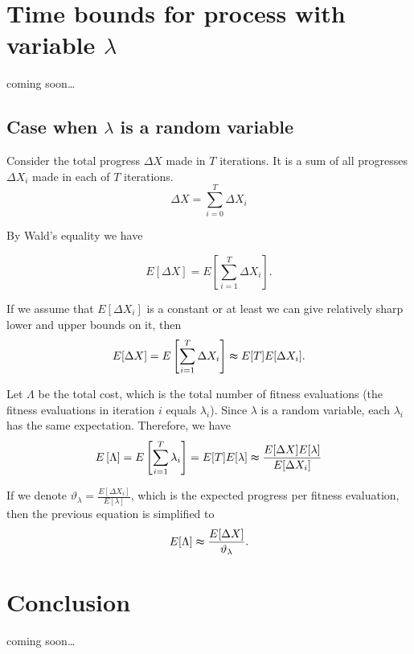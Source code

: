 \documentclass[12pt, a4paper]{article}
\theoremstyle{remark}
\newcommand{\cm}{coming soon\dots}
\begin{document}



\section{Time bounds for process with variable $\lambda$}
\cm
\subsection{Case when $\lambda$ is a random variable}
Consider the total progress $\Delta X$ made in $T$ iterations. It is a sum of all progresses $\Delta X_i$ made in each of $T$ iterations.
\[
    \Delta X = \sum_{i = 0}^{T} \Delta X_i
\]

By Wald's equality we have

\[
    E[\Delta X] = E\left[\sum_{i = 1}^{T} \Delta X_i\right].
\]

If we assume that $E[\Delta X_i]$ is a constant or at least we can give relatively sharp lower and upper bounds on it, then
\[
    E[\Delta X] = E\left[\sum_{i = 1}^{T} \Delta X_i\right] \thickapprox E[T] E[\Delta X_i].
\]

Let $\Lambda$ be the total cost, which is the total number of fitness evaluations (the fitness evaluations in iteration $i$ equals $\lambda_i$). Since $\lambda$ is a random variable, each $\lambda_i$ has the same expectation. Therefore, we have
\[
    E\left[\Lambda\right] = E\left[\sum_{i = 1}^{T} \lambda_i\right] = E[T] E[\lambda] \thickapprox \frac{E[\Delta X] E[\lambda]}{E[\Delta X_i]}
\]

If we denote $\vartheta_\lambda = \frac{E[\Delta X_i]}{E[\lambda]}$, which is the expected progress per fitness evaluation, then the previous equation is simplified to
\[
    E[\Lambda] \thickapprox \frac{E[\Delta X]}{\vartheta_\lambda}.
\]

\section{Conclusion}
\cm




\end{document}
